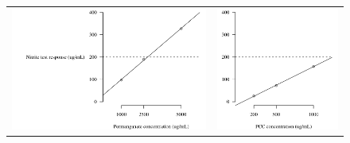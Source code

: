 \documentclass[article,11pt,oneside]{memoir}
\begin{document}
\begin{figure}[p!]
\centering
\noindent
\begin{tabular}{rr}
\includegraphics[scale=0.63]{permanganate}
& \includegraphics[scale=0.63]{pcc} \tabularnewline

\end{tabular}
\end{figure}
\end{document}
